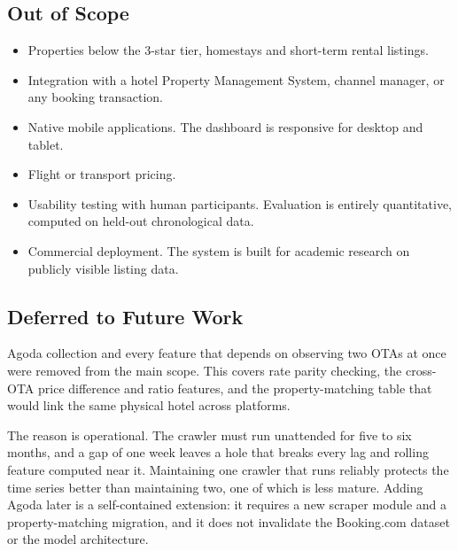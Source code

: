\subsection{Out of Scope}

\begin{itemize}[leftmargin=*]
    \item Properties below the 3-star tier, homestays and short-term rental listings.
    \item Integration with a hotel Property Management System, channel manager, or any booking transaction.
    \item Native mobile applications. The dashboard is responsive for desktop and tablet.
    \item Flight or transport pricing.
    \item Usability testing with human participants. Evaluation is entirely quantitative, computed on held-out chronological data.
    \item Commercial deployment. The system is built for academic research on publicly visible listing data.
\end{itemize}

\subsection{Deferred to Future Work}
\label{sec:deferred}

Agoda collection and every feature that depends on observing two OTAs at once were removed from the main scope. This covers rate parity checking, the cross-OTA price difference and ratio features, and the property-matching table that would link the same physical hotel across platforms.

The reason is operational. The crawler must run unattended for five to six months, and a gap of one week leaves a hole that breaks every lag and rolling feature computed near it. Maintaining one crawler that runs reliably protects the time series better than maintaining two, one of which is less mature. Adding Agoda later is a self-contained extension: it requires a new scraper module and a property-matching migration, and it does not invalidate the Booking.com dataset or the model architecture.

